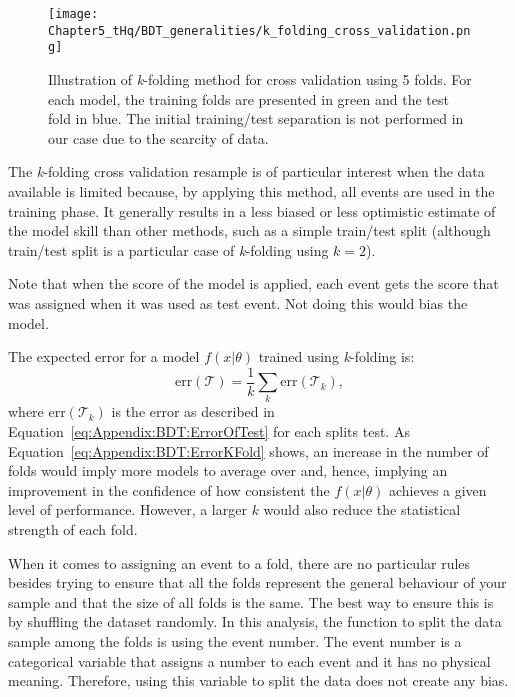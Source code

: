 \begin{figure}[h]
\centering
  \centering
  \texttt{[image: Chapter5\_tHq/BDT\_generalities/k\_folding\_cross\_validation.png]}
\caption{Illustration of \textit{k}-folding method for cross validation using 5 folds. For each model, the 
training folds are presented in green and the test fold in blue. The initial training/test separation is not performed
in our case due to the scarcity of data.} 
\label{fig:Appendix:BDT:kfold}
\end{figure}

The \textit{k}-folding cross validation resample is of particular interest when the data available is limited 
because, by applying this method, all events are used in the training phase.  It generally results in a less biased 
or less optimistic estimate of the model skill than other methods, such as a simple train/test split (although train/test split
is a particular case of \textit{k}-folding using $k=2$).

Note that when the score of the model is applied, each event gets the score that was assigned when
it was used as test event. Not doing this would bias the model.

The expected error for a model $f(x|\theta)$ trained using \textit{k}-folding is:
\begin{equation}
\label{eq:Appendix:BDT:ErrorKFold}
	\text{err}(\mathcal{T}) = \frac{1}{k} \sum_{k} \text{err}(\mathcal{T}_{k}) ,
\end{equation}
where $\text{err}(\mathcal{T}_{k})$ is the error as described in Equation~\ref{eq:Appendix:BDT:ErrorOfTest} for each splits test.
As Equation~\ref{eq:Appendix:BDT:ErrorKFold} shows, an increase in the number of folds would imply more
models to average over and, hence, implying an improvement in the confidence of how consistent 
the $f(x|\theta)$ achieves a given level of performance. However, a larger $k$ would also reduce
the statistical strength of each fold.


When it comes to assigning an event to a fold, there are no particular rules besides trying to ensure that
all the folds represent the general behaviour of your sample and that the size of all folds is
the same. The best way to ensure this is by shuffling the dataset randomly. In this analysis,
the function to split the data sample among the folds is using the event number. The
event number is a categorical variable that assigns a number to each event and it has
no physical meaning. Therefore, using this variable to split the data does not create 
any bias. 

